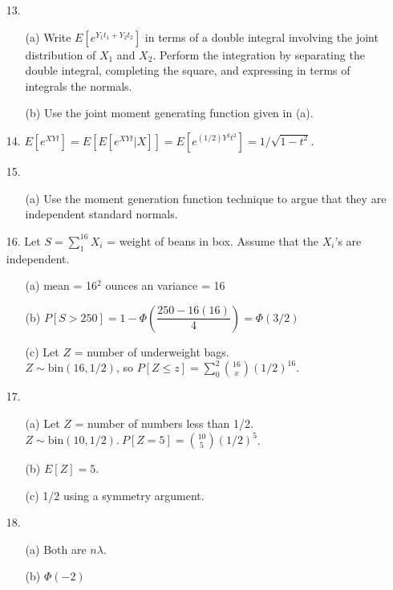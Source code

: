 \begin{enumerate}
	\item[13.] \begin{enumerate}
		\item[(a)] Write $E[e^{Y_1t_1+Y_2t_2}]$ in terms of a double integral involving the joint distribution of $X_1$ and $X_2$. Perform the integration by separating the double integral, completing the square, and expressing in terms of integrals the normals.
		\item[(b)] Use the joint moment generating function given in (a).
	\end{enumerate}
	
	\item[14.] $E[e^{XYt}] = E[E[e^{XYt}\vert X]] = E[e^{(1/2)Y^2t^2}] = 1/\sqrt{1-t^2}$.
	
	\item[15.] \begin{itemize}
		\item[(a)] Use the moment generation function technique to argue that they are independent standard normals.
	\end{itemize}
	
	\item[16.] Let $\displaystyle S = \sum_{1}^{16}X_i$ = weight of beans in box. Assume that the $X_i$'s are independent. 
	\begin{enumerate}
		\item[(a)] mean = 16$^2$ ounces an variance = 16
		\item[(b)] $P[S> 250] = 1-\Phi\left(\dfrac{250-16(16)}{4}\right) = \Phi(3/2)$
		\item[(c)] Let $Z$ = number of underweight bags. \\
					$Z\sim \mbox{bin}(16,1/2)$, so $P[Z\le z] = \displaystyle\sum_{0}^{2}{16\choose x}(1/2)^{16}$. 
	\end{enumerate}
	
	\item[17.] \begin{enumerate}
		\item[(a)] Let $Z$ = number of numbers less than 1/2. $Z\sim\mbox{bin}(10,1/2).\ P[Z=5]=\displaystyle{10\choose 5}(1/2)^5$.
		\item[(b)] $E[Z]=5$.
		\item[(c)] 1/2 using a symmetry argument.
	\end{enumerate}
	
	\newpage
	\item[18.] \begin{enumerate}
		\item[(a)] Both are $n\lambda$.
		\item[(b)] $\Phi(-2)$
	\end{enumerate}


\end{enumerate}
